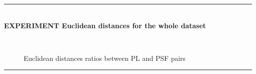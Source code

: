 \rule{0.5\textwidth}{0.5pt}\\

	{\large \textbf{EXPERIMENT Euclidean distances for the whole dataset}}\\
	
	\begin{figure*}[ht!]
		\centering
		\\
		\caption{Euclidean distances ratios between PL and PSF pairs}\hspace{\fill}
	\end{figure*}
	
\FloatBarrier	
\rule{0.5\textwidth}{0.5pt}\\